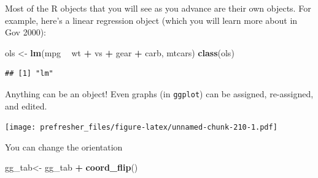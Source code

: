 \documentclass[]{book}
\newenvironment{Shaded}{\begin{snugshade}}{\end{snugshade}}
\newcommand{\DataTypeTok}[1]{\textcolor[rgb]{0.13,0.29,0.53}{#1}}
\newcommand{\KeywordTok}[1]{\textcolor[rgb]{0.13,0.29,0.53}{\textbf{#1}}}
\newcommand{\NormalTok}[1]{#1}
\newcommand{\OperatorTok}[1]{\textcolor[rgb]{0.81,0.36,0.00}{\textbf{#1}}}
\newcommand{\StringTok}[1]{\textcolor[rgb]{0.31,0.60,0.02}{#1}}
\theoremstyle{definition}
\theoremstyle{definition}
\theoremstyle{definition}
\theoremstyle{remark}
\begin{document}
Most of the R objects that you will see as you advance are their own objects. For example, here's a linear regression object (which you will learn more about in Gov 2000):

\begin{Shaded}
\begin{Highlighting}[]
\NormalTok{ols <-}\StringTok{ }\KeywordTok{lm}\NormalTok{(mpg }\OperatorTok{~}\StringTok{ }\NormalTok{wt }\OperatorTok{+}\StringTok{ }\NormalTok{vs }\OperatorTok{+}\StringTok{ }\NormalTok{gear }\OperatorTok{+}\StringTok{ }\NormalTok{carb, mtcars)}
\KeywordTok{class}\NormalTok{(ols)}
\end{Highlighting}
\end{Shaded}

\begin{verbatim}
## [1] "lm"
\end{verbatim}

Anything can be an object! Even graphs (in \texttt{ggplot}) can be assigned, re-assigned, and edited.

\begin{Shaded}
\end{Shaded}

\texttt{[image: prefresher\_files/figure-latex/unnamed-chunk-210-1.pdf]}

You can change the orientation

\begin{Shaded}
\begin{Highlighting}[]
\NormalTok{gg_tab<-}\StringTok{ }\NormalTok{gg_tab }\OperatorTok{+}\StringTok{ }\KeywordTok{coord_flip}\NormalTok{()}
\end{Highlighting}
\end{Shaded}
\end{document}

